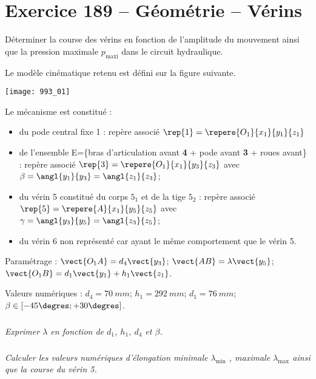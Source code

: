 \section*{Exercice 189 -- Géométrie -- Vérins}
\setcounter{exo}{0}

\begin{obj}
Déterminer la course des vérins en fonction de l’amplitude du mouvement ainsi que la pression maximale $p_{\text{maxi}}$ dans le circuit hydraulique.
\end{obj}

Le modèle cinématique retenu est défini sur la figure suivante.


\begin{center}
\texttt{[image: 993\_01]}
\end{center}

Le mécanisme est constitué :
\begin{itemize}
\item du pode central fixe 1 : repère associé $\rep{1}=\repere{O_1}{x_1}{y_1}{z_1}$
\item de l’ensemble E=\{bras d’articulation avant \textbf{4} + pode avant \textbf{3} + roues avant\} : repère associé 
$\rep{3}=\repere{O_1}{x_1}{y_3}{z_3}$ avec $\beta=\angl{y_1}{y_3}=\angl{z_1}{z_3}$;
\item du vérin 5 constitué du corps $5_1$ et de la tige $5_2$ : repère associé $\rep{5}=\repere{A}{x_1}{y_5}{z_5}$ 
 avec $\gamma=\angl{y_3}{y_5}=\angl{z_3}{z_5}$;
\item du vérin 6 non représenté car ayant le même comportement que le vérin 5.
\end{itemize}

Paramétrage : $\vect{O_1A}=d_4\vect{y_3}$; $\vect{AB}=\lambda\vect{y_5}$; $\vect{O_1B}=d_1\vect{y_1}+h_1\vect{z_1}$.

Valeurs numériques : $d_4 = \SI{70}{mm}$; $h_1 = \SI{292}{mm}$; $d_1 = \SI{76}{mm}$; $\beta\in\left[-45\degres;+30\degres\right]$.



\subparagraph{}
\textit{Exprimer $\lambda$ en fonction de $d_1$, $h_1$, $d_4$ et $\beta$.}
\ifprof
\begin{corrige}
\end{corrige}
\else
\fi


\subparagraph{}
\textit{Calculer les valeurs numériques d’élongation minimale $\lambda_{\text{min}}$ , maximale $\lambda_{\text{max}}$ ainsi que la course du vérin 5.}
\ifprof
\begin{corrige}
\end{corrige}
\else
\fi


